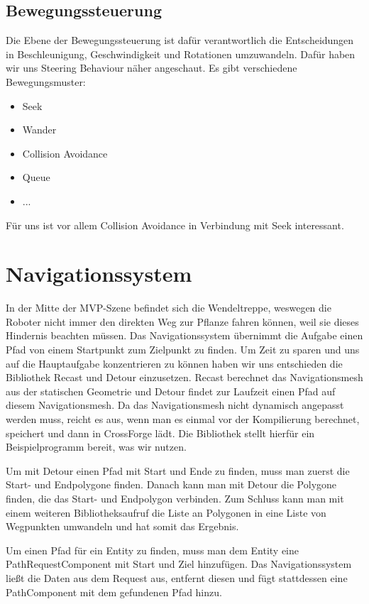 \subsection{Bewegungssteuerung}

Die Ebene der Bewegungssteuerung ist dafür verantwortlich die Entscheidungen in Beschleunigung, Geschwindigkeit und Rotationen umzuwandeln. Dafür haben wir uns Steering Behaviour näher angeschaut. Es gibt verschiedene Bewegungsmuster:

\begin{itemize}
\item Seek
\item Wander
\item Collision Avoidance
\item Queue
\item ...
\end{itemize}

Für uns ist vor allem Collision Avoidance in Verbindung mit Seek interessant.

\section{Navigationssystem}

In der Mitte der MVP-Szene befindet sich die Wendeltreppe, weswegen die Roboter nicht immer den direkten Weg zur Pflanze fahren können, weil sie dieses Hindernis beachten müssen. Das Navigationssystem übernimmt die Aufgabe einen Pfad von einem Startpunkt zum Zielpunkt zu finden. Um Zeit zu sparen und uns auf die Hauptaufgabe konzentrieren zu können haben wir uns entschieden die Bibliothek Recast und Detour einzusetzen. Recast berechnet das Navigationsmesh aus der statischen Geometrie und Detour findet zur Laufzeit einen Pfad auf diesem Navigationsmesh. Da das Navigationsmesh nicht dynamisch angepasst werden muss, reicht es aus, wenn man es einmal vor der Kompilierung berechnet, speichert und dann in CrossForge lädt. Die Bibliothek stellt hierfür ein Beispielprogramm bereit, was wir nutzen.

Um mit Detour einen Pfad mit Start und Ende zu finden, muss man zuerst die Start- und Endpolygone finden. Danach kann man mit Detour die Polygone finden, die das Start- und Endpolygon verbinden. Zum Schluss kann man mit einem weiteren Bibliotheksaufruf die Liste an Polygonen in eine Liste von Wegpunkten umwandeln und hat somit das Ergebnis.

Um einen Pfad für ein Entity zu finden, muss man dem Entity eine PathRequestComponent mit Start und Ziel hinzufügen. Das Navigationssystem ließt die Daten aus dem Request aus, entfernt diesen und fügt stattdessen eine PathComponent mit dem gefundenen Pfad hinzu.

